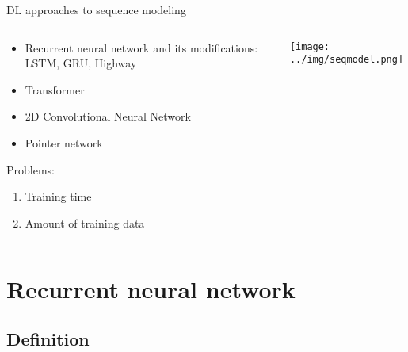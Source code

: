 \documentclass[usenames,dvipsnames,handout,aspectratio=169]{beamer}
\begin{document}
\begin{frame}{DL approaches to sequence modeling}
\begin{columns}
\begin{column}{0.6\textwidth}

\begin{itemize}
	
\item Recurrent neural network and its modifications: LSTM, GRU, Highway
\item Transformer
\item 2D Convolutional Neural Network
\item Pointer network
\end{itemize}

Problems:
\begin{enumerate}
	\item Training time
	\item Amount of training data
\end{enumerate}
\end{column}
\begin{column}{0.4\textwidth}  %
    \begin{center}
	\texttt{[image: ../img/seqmodel.png]}
     \end{center}
\end{column}
\end{columns}
\end{frame}

\section{Recurrent neural network}
\subsection{Definition}
\end{document}
